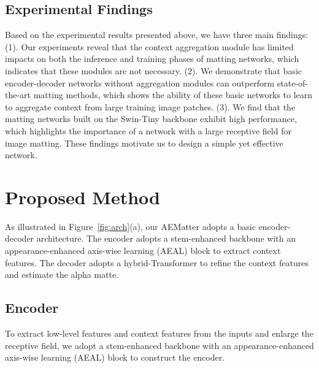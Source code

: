 \documentclass[10pt,twocolumn,letterpaper]{article}
\begin{document}
\subsection{Experimental Findings}
Based on the experimental results presented above, we have three main findings:
(1). Our experiments reveal that the context aggregation module has limited impacts on both the inference and training phases of matting networks, which indicates that these modules are not necessary. 
(2). We demonstrate that basic encoder-decoder networks without aggregation modules can outperform state-of-the-art matting methods, which shows the ability of these basic networks to learn to aggregate context from large training image patches.
(3). We find that the matting networks built on the Swin-Tiny backbone exhibit high performance, which highlights the importance of a network with a large receptive field for image matting.
These findings motivate us to design a simple yet effective network.




\section{Proposed Method}
As illustrated in Figure~\ref{fig:arch}(a), our AEMatter adopts a basic encoder-decoder architecture. 
The encoder adopts a stem-enhanced backbone with an appearance-enhanced axis-wise learning (AEAL) block to extract context features. 
The decoder adopts a hybrid-Transformer to refine the context features and estimate the alpha matte.

\subsection{Encoder}
To extract low-level features and context features from the inputs and enlarge the receptive field, we adopt a stem-enhanced backbone with an appearance-enhanced axis-wise learning (AEAL) block to construct the encoder.
\end{document}

